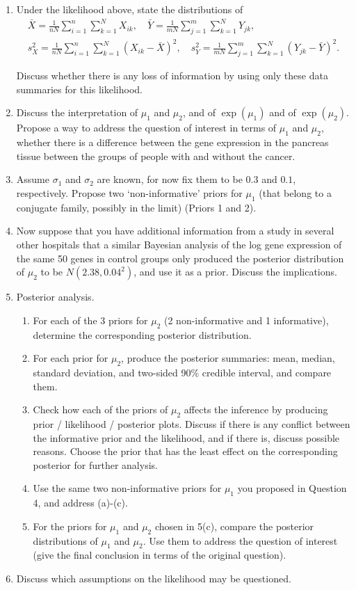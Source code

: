 \documentclass[12pt]{report}
\begin{document}
\begin{enumerate}
\item Under the likelihood  above, state the distributions of
\begin{gather*}
\bar{X} = \frac{1}{nN}\sum_{i=1}^n \sum_{k=1}^N X_{ik}, \quad \bar{Y} = \frac{1}{mN}\sum_{j=1}^m \sum_{k=1}^N Y_{jk},\\
s_X^2 = \frac{1}{nN}\sum_{i=1}^n \sum_{k=1}^N (X_{ik}-\bar{X})^2, \quad s_Y^2 = \frac{1}{mN}\sum_{j=1}^m \sum_{k=1}^N (Y_{jk}-\bar{Y})^2.
\end{gather*}

Discuss whether there is any loss of information by using only these data summaries  for this likelihood.

\item Discuss the interpretation of $\mu_1$ and $\mu_2$, and of $\exp(\mu_1)$ and of $\exp(\mu_2)$. Propose a way to address the question of interest in terms of $\mu_1$ and $\mu_2$, whether there is a difference between the gene expression in the pancreas tissue between the groups of people with and without the cancer.

\item Assume $\sigma_1$ and $\sigma_2$ are known, for now fix them to be $0.3$ and $0.1$, respectively. Propose two `non-informative' priors for $\mu_1$ (that belong to a conjugate family, possibly in the limit) (Priors 1 and 2).

\item Now suppose that you have additional information from a study in several other hospitals that a similar Bayesian analysis of the log gene expression of the same 50 genes in control groups only produced the posterior distribution of $\mu_2$ to be $N(2.38,0.04^2)$, and use it as a prior. Discuss the implications.

\item Posterior analysis.
\begin{enumerate}
\item For each of the 3 priors for $\mu_2$ (2 non-informative and 1 informative), determine the corresponding posterior distribution.
\item For each prior for $\mu_2$, produce the posterior summaries: mean, median, standard deviation, and two-sided 90\% credible interval, and compare them.
\item Check how each of the priors of $\mu_2$ affects the inference by producing prior / likelihood / posterior plots. Discuss if there is any conflict between the informative prior and the likelihood, and if there is, discuss possible reasons. Choose the prior that has the least effect on the corresponding posterior for further analysis.
\item Use the same two non-informative priors for $\mu_1$ you proposed in Question 4, and address (a)-(c).
\item For the priors for $\mu_1$ and  $\mu_2$ chosen in 5(c), compare the posterior distributions of $\mu_1$ and $\mu_2$. Use them to address the question of interest (give the final conclusion in terms of the original question). 
\end{enumerate}

\item Discuss which assumptions on the likelihood may be questioned.

\end{enumerate}
\end{document}
